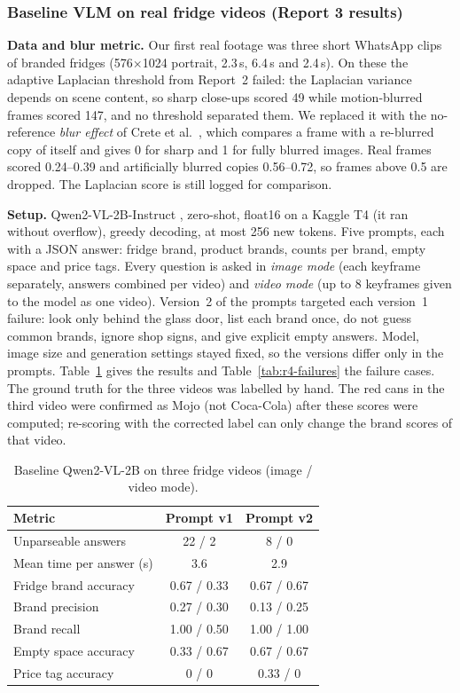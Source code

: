 \subsubsection{Baseline VLM on real fridge videos (Report 3 results)}\label{sec:r4-baseline}
\textbf{Data and blur metric.} Our first real footage was three short WhatsApp clips of branded
fridges (576$\times$1024 portrait, 2.3\,s, 6.4\,s and 2.4\,s). On these the adaptive Laplacian
threshold from Report~2 failed: the Laplacian variance depends on scene content, so sharp close-ups
scored 49 while motion-blurred frames scored 147, and no threshold separated them. We replaced it
with the no-reference \emph{blur effect} of Crete et al.\ \cite{crete2007blur}, which compares a
frame with a re-blurred copy of itself and gives 0 for sharp and 1 for fully blurred images. Real
frames scored 0.24--0.39 and artificially blurred copies 0.56--0.72, so frames above 0.5 are
dropped. The Laplacian score is still logged for comparison.

\textbf{Setup.} Qwen2-VL-2B-Instruct \cite{wang2024qwen2vl}, zero-shot, float16 on a Kaggle T4
(it ran without overflow), greedy decoding, at most 256 new tokens. Five prompts, each with a JSON
answer: fridge brand, product brands, counts per brand, empty space and price tags. Every question
is asked in \emph{image mode} (each keyframe separately, answers combined per video) and
\emph{video mode} (up to 8 keyframes given to the model as one video). Version~2 of the prompts
targeted each version~1 failure: look only behind the glass door, list each brand once, do not
guess common brands, ignore shop signs, and give explicit empty answers. Model, image size and
generation settings stayed fixed, so the versions differ only in the prompts.
Table~\ref{tab:r4-baseline} gives the results and Table~\ref{tab:r4-failures} the failure cases.
The ground truth for the three videos was labelled by hand. The red cans in the third video were
confirmed as Mojo (not Coca-Cola) after these scores were computed; re-scoring with the corrected
label can only change the brand scores of that video.

\begin{table}[!t]
\centering
\caption{Baseline Qwen2-VL-2B on three fridge videos (image / video mode).}
\label{tab:r4-baseline}
\begin{tabular}{lcc}
\hline
Metric & Prompt v1 & Prompt v2 \\
\hline
Unparseable answers & 22 / 2 & 8 / 0 \\
Mean time per answer (s) & 3.6 & 2.9 \\
Fridge brand accuracy & 0.67 / 0.33 & 0.67 / 0.67 \\
Brand precision & 0.27 / 0.30 & 0.13 / 0.25 \\
Brand recall & 1.00 / 0.50 & 1.00 / 1.00 \\
Empty space accuracy & 0.33 / 0.67 & 0.67 / 0.67 \\
Price tag accuracy & 0 / 0 & 0.33 / 0 \\
\hline
\end{tabular}
\end{table}

